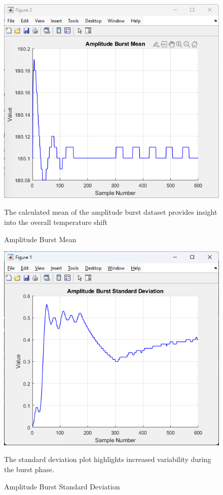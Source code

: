 \documentclass[journal]{IEEEtran}
\begin{document}
\begin{figure}[H]
    \centering
    \includegraphics[width=\linewidth]{5.1.2.png}
    \caption{Amplitude Burst Mean}
    \begin{minipage}{\linewidth}
      The calculated mean of the amplitude burst dataset provides insight into the overall temperature shift
    \end{minipage}
    \label{fig:amplitude_burst_mean}
\end{figure}

\vspace{-10mm} %

\begin{figure}[H]
    \centering
    \includegraphics[width=\linewidth]{5.1.3.png}
    \caption{Amplitude Burst Standard Deviation}
    \begin{minipage}{\linewidth}
      The standard deviation plot highlights increased variability during the burst phase.
    \end{minipage}
    \label{fig:amplitude_burst_stddev}
\end{figure}
\end{document}
